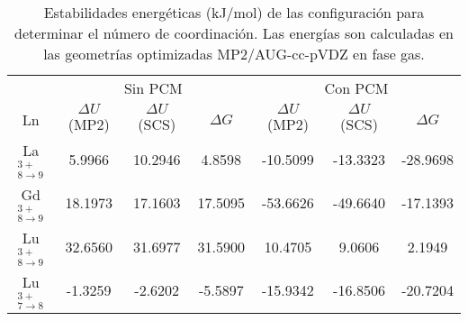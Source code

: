 \begin{table}[h!]
\centering
\caption{\footnotesize Estabilidades energ\'eticas (kJ/mol) de las
configuraci\'on para determinar el n\'umero de coordinaci\'on. Las
energ\'ias son calculadas en las geometr\'ias optimizadas 
MP2/AUG-cc-pVDZ en fase gas.}%
\begin{tabular}{c|ccc|ccc|}\hline\hline
   & \multicolumn{3}{c}{Sin PCM} & \multicolumn{3}{|c|}{Con PCM} \\ 
Ln & $\Delta U$ (MP2)  & $\Delta U$ (SCS) & $\Delta G$          
   & $\Delta U$ (MP2)  & $\Delta U$ (SCS) & $\Delta G$ \\ \hline
La$^{3+}_{8\to 9}$ &   5.9966 &  10.2946 &   4.8598   
                & -10.5099 & -13.3323 & -28.9698 \\
Gd$^{3+}_{8\to 9}$ &  18.1973 &  17.1603 &  17.5095    
                & -53.6626 & -49.6640 & -17.1393 \\ 
Lu$^{3+}_{8\to 9}$ &  32.6560 &  31.6977 &  31.5900    
                &  10.4705 &   9.0606 &   2.1949 \\ 
Lu$^{3+}_{7\to 8}$ &  -1.3259 &  -2.6202 &  -5.5897    
                & -15.9342 & -16.8506 & -20.7204 \\ 
\hline \end{tabular}\label{t1}\end{table}
